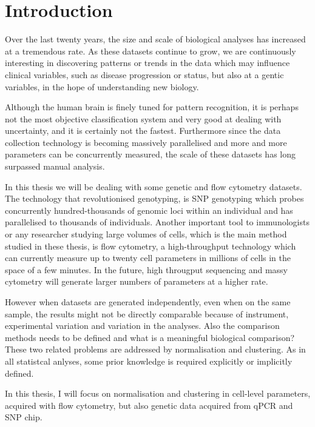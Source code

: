 %

\chapter[Introduction]{ \label{chapter:intro} Introduction}

Over the last twenty years, the size and scale of biological analyses has increased at a tremendous rate.
As these datasets continue to grow, we are continuously interesting in discovering patterns or trends in the data
which may influence clinical variables, such as disease progression or status,
but also at a gentic variables, in the hope of understanding new biology.

Although the human brain is finely tuned for pattern recognition, it is perhaps not the most objective classification system
and very good at dealing with uncertainty, and it is certainly not the fastest.
Furthermore since the data collection technology is becoming massively parallelised
and more and more parameters can be concurrently measured, the scale of these datasets has long surpassed manual analysis.

In this thesis we will be dealing with some genetic and flow cytometry datasets.
The technology that revolutionised genotyping, is SNP genotyping which probes concurrently hundred-thousands of genomic loci within an individual and has parallelised
to thousands of individuals.
Another important tool to immunologists or any researcher studying large volumes of cells,
which is the main method studied in these thesis, is flow cytometry, a high-throughput technology which can currently measure up to twenty cell
parameters in millions of cells in the space of a few minutes.
In the future, high througput sequencing and massy cytometry will generate larger numbers of parameters at a higher rate.

However when datasets are generated independently, even when on the same sample, the results might not be directly comparable because of
instrument, experimental variation and variation in the analyses.
Also the comparison methods needs to be defined and what is a meaningful biological comparison?
These two related problems are addressed by normalisation and clustering.
As in all statistcal anlyses, some prior knowledge is required explicitly or implicitly defined.

In this thesis, I will focus on normalisation and clustering in cell-level parameters, acquired with flow cytometry,
but also genetic data acquired from qPCR and SNP chip.

